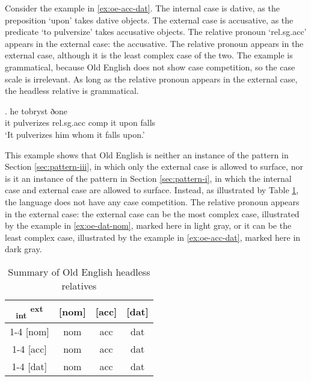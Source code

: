 Consider the example in \ref{ex:oe-acc-dat}.
The internal case is dative, as the preposition  `upon' takes dative objects.
The external case is accusative, as the predicate  `to pulversize' takes accusative objects.
The relative pronoun  `\ac{rel}.\ac{sg}.\ac{acc}' appears in the external case: the accusative.
The relative pronoun appears in the external case, although it is the least complex case of the two. The example is grammatical, because Old English does not show case competition, so the case scale is irrelevant. As long as the relative pronoun appears in the external case, the headless relative is grammatical.

\exg. he tobryst ðone    \\
 it pulverizes\scsub{[acc]} \ac{rel}.\ac{sg}.\ac{acc} \ac{comp} it upon\scsub{[dat]} falls\\
`It pulverizes him whom it falls upon.'  \label{ex:oe-acc-dat}

This example shows that Old English is neither an instance of the pattern in Section \ref{sec:pattern-iii}, in which only the external case is allowed to surface, nor is it an instance of the pattern in Section \ref{sec:pattern-i}, in which the internal case and external case are allowed to surface.
Instead, as illustrated by Table \ref{tbl:no-case-competition-old-english}, the language does not have any case competition. The relative pronoun appears in the external case: the external case can be the most complex case, illustrated by the example in \ref{ex:oe-dat-nom}, marked here in light gray, or it can be the least complex case, illustrated by the example in \ref{ex:oe-acc-dat}, marked here in dark gray.

\begin{table}[ht]
  \center
  \caption{Summary of Old English headless relatives}
  \begin{tabular}{c|c|c|c}
    \toprule
   \textsubscript{\ac{int}} \textsuperscript{\ac{ext}}
          & [\ac{nom}]
          & [\ac{acc}]
          & [\ac{dat}]
          \\ \cmidrule{1-4}
      [\ac{nom}]
          & \ac{nom}
          & \ac{acc}
          & \cellcolor{LG}\ac{dat}
          \\ \cmidrule{1-4}
      [\ac{acc}]
          & \ac{nom}
          & \ac{acc}
          & \ac{dat}
          \\ \cmidrule{1-4}
      [\ac{dat}]
          & \ac{nom}
          & \cellcolor{DG}\ac{acc}
          & \ac{dat}
          \\
    \bottomrule
  \end{tabular}
  \label{tbl:no-case-competition-old-english}
\end{table}

